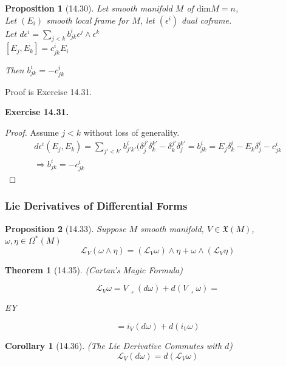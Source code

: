 \documentclass[11pt]{amsart}
\newtheorem{theorem}{Theorem}
\newtheorem{proposition}{Proposition}
\newtheorem{corollary}{Corollary}
\theoremstyle{definition}
\newcommand{\exercisehead}[1]{\medskip\noindent\textbf{Exercise #1.} }
\begin{document}
\begin{proposition}[14.30]
  Let smooth manifold $M$ of $\text{dim}M = n$, \\
  Let $(E_i)$ smooth local frame for $M$, let $(\epsilon^i)$ dual coframe. \\
  Let $d\epsilon^i = \sum_{j<k} b^i_{jk} \epsilon^j \wedge \epsilon^k $ \\
  \phantom{Let }$[E_j,E_k] = c^i_{jk} E_i$

Then $b^i_{jk} = -c^i_{jk}$
\end{proposition}

Proof is Exercise 14.31.

\exercisehead{14.31}

\begin{proof}
  Assume $j <k$ without loss of generality.
  \[
\begin{gathered}
  d\epsilon^i(E_j,E_k) = \sum_{j' < k'} b^i_{j'k'}(\delta^{j'}_j \delta^{k'}_k - \delta^{j'}_k \delta^{k'}_j = b^i_{jk} = E_j \delta^i_k - E_k \delta^i_j - c^i_{jk} \\
  \Longrightarrow b^i_{jk} = -c^i_{jk}
\end{gathered}
\]
\end{proof}

\subsubsection*{Lie Derivatives of Differential Forms}


\begin{proposition}[14.33]
  Suppose $M$ smooth manifold, $V \in \mathfrak{X}(M)$, $\omega, \eta \in \Omega^*(M)$
\[
\mathcal{L}_V(\omega \wedge \eta) = (\mathcal{L}_V \omega) \wedge \eta + \omega \wedge (\mathcal{L}_V \eta)
\]
\end{proposition}

\begin{theorem}[14.35] (Cartan's Magic Formula)

\[
\mathcal{L}_V \omega = V \mathbin{\lrcorner} (d\omega) + d(V\mathbin{\lrcorner} \omega) =
\]

EY

\[
= i_V(d\omega) + d(i_V\omega)
\]
\end{theorem}

\begin{corollary}[14.36] (The Lie Derivative Commutes with $d$)
\[
\mathcal{L}_V(d\omega) = d(\mathcal{L}_V\omega)
\]
\end{corollary}
\end{document}
